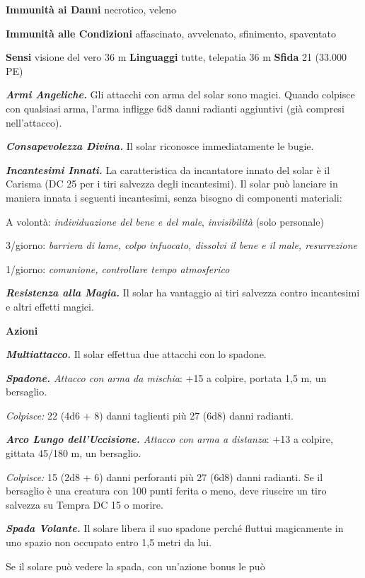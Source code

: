 \begin{multicols}{2}
\textbf{Immunità ai Danni} necrotico, veleno

\textbf{Immunità alle Condizioni} affascinato, avvelenato, sfinimento,
spaventato

\textbf{Sensi} visione del vero 36 m
\textbf{Linguaggi} tutte, telepatia 36 m \textbf{Sfida} 21 (33.000 PE)

\emph{\textbf{Armi Angeliche.}} Gli attacchi con arma del solar sono
magici. Quando colpisce con qualsiasi arma, l'arma infligge 6d8 danni
radianti aggiuntivi (già compresi nell'attacco).

\emph{\textbf{Consapevolezza Divina.}} Il solar riconosce immediatamente
le bugie.

\emph{\textbf{Incantesimi Innati.}} La caratteristica da incantatore
innato del solar è il Carisma (DC 25 per i tiri salvezza degli
incantesimi). Il solar può lanciare in maniera innata i seguenti
incantesimi, senza bisogno di componenti materiali:

A volontà: \emph{individuazione del bene e del male},
\emph{invisibilità} (solo personale)

3/giorno: \emph{barriera di lame, colpo infuocato, dissolvi il bene e
il} \emph{male, resurrezione}

1/giorno: \emph{comunione, controllare tempo atmosferico}

\emph{\textbf{Resistenza alla Magia.}} Il solar ha vantaggio ai tiri
salvezza contro incantesimi e altri effetti magici.

\textbf{Azioni}

\emph{\textbf{Multiattacco.}} Il solar effettua due attacchi con lo
spadone.

\emph{\textbf{Spadone.} Attacco con arma da mischia}: +15 a colpire,
portata 1,5 m, un bersaglio.

\emph{Colpisce:} 22 (4d6 + 8) danni taglienti più 27 (6d8) danni
radianti.

\emph{\textbf{Arco Lungo dell'Uccisione.} Attacco con arma a distanza}:
+13 a colpire, gittata 45/180 m, un bersaglio.

\emph{Colpisce:} 15 (2d8 + 6) danni perforanti più 27 (6d8) danni
radianti. Se il bersaglio è una creatura con 100 punti ferita o meno,
deve riuscire un tiro salvezza su Tempra DC 15 o morire.

\emph{\textbf{Spada Volante.}} Il solare libera il suo spadone perché
fluttui magicamente in uno spazio non occupato entro 1,5 metri da lui.

Se il solare può vedere la spada, con un'azione bonus le può


\end{multicols}
